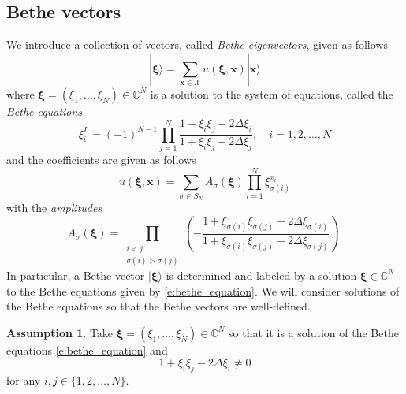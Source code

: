 \documentclass[a4paper,11pt]{article}
\theoremstyle{definition}
\newtheorem{assumption}[theorem]{Assumption}
\begin{document}
\subsection{Bethe vectors}
We introduce a collection of vectors, called \emph{Bethe eigenvectors}, given as follows
\begin{equation}\label{e:bethe_vector}
    | \mathbf{\boldsymbol{\xi}} \rangle = \sum_{\mathbf{x} \in \mathcal{X}} u(\mathbf{\boldsymbol{\xi}}, \mathbf{x}) | \mathbf{x} \rangle
\end{equation}
where $\mathbf{\boldsymbol{\xi}} = (\xi_1, \dots, \xi_N) \in \mathbb{C}^N$ is a solution to the system of equations, called the \emph{Bethe equations}
\begin{equation}\label{e:bethe_equation}
    \xi_i^L = (-1)^{N-1} \prod_{j=1}^N \frac{1 + \xi_i \xi_j - 2 \Delta \xi_i}{1 + \xi_i \xi_j - 2 \Delta \xi_j}, \quad i =1, 2, \dots, N
\end{equation}
and the coefficients are given as follows
\begin{equation}\label{e:coefficients}
    u(\mathbf{\boldsymbol{\xi}}, \mathbf{x}) = \sum_{\sigma \in S_N} A_{\sigma}(\mathbf{\boldsymbol{\xi}}) \prod_{i=1}^N \xi_{\sigma(i)}^{x_i}
\end{equation}
with the \emph{amplitudes}
\begin{equation}\label{e:amplitude}
    A_{\sigma}(\mathbf{\boldsymbol{\xi}}) = \prod_{\substack{i < j \\ \sigma(i) > \sigma(j)}} \left(- \frac{1 + \xi_{\sigma(i)} \xi_{\sigma(j)} - 2 \Delta \xi_{\sigma(i)}}{1 + \xi_{\sigma(i)} \xi_{\sigma(j)} -2  \Delta \xi_{\sigma(j)}} \right).
\end{equation}
In particular, a Bethe vector $| \mathbf{\boldsymbol{\xi}} \rangle$ is determined and labeled by a solution $\mathbf{\boldsymbol{\xi}} \in \mathbb{C}^N$ to the Bethe equations given by \eqref{e:bethe_equation}. We will consider solutions of the Bethe equations so that the Bethe vectors are well-defined.

\begin{assumption}\label{a:generic}
Take $\mathbf{\boldsymbol{\xi}} = (\xi_1, \dots, \xi_N) \in \mathbb{C}^N$ so that it is a solution of the Bethe equations \eqref{e:bethe_equation} and
\begin{equation}\label{e:generic}
    1 + \xi_i \xi_j - 2 \Delta \xi_i \neq 0
\end{equation}
for any $i, j \in \{1, 2,\dots, N\}$.
\end{assumption}
\end{document}
